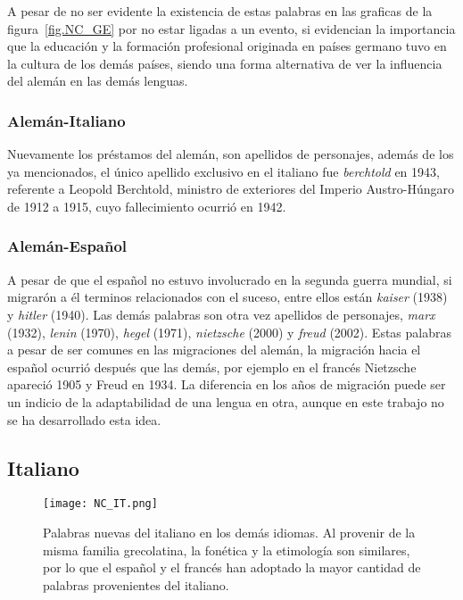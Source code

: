 A pesar de no ser evidente la existencia de estas palabras en las graficas de la figura~\ref{fig.NC_GE} por no estar ligadas a un evento, si evidencian la importancia que la educación y la formación profesional originada en países germano tuvo en la cultura de los demás países,  siendo una forma alternativa de ver la influencia del alemán en las demás lenguas. 

\subsubsection*{Alemán-Italiano}%

Nuevamente los préstamos del alemán,  son apellidos de personajes,  además de los ya mencionados, el único apellido exclusivo en el italiano fue \textit{berchtold} en 1943, referente a Leopold Berchtold, ministro de exteriores del Imperio Austro-Húngaro de 1912 a 1915, cuyo fallecimiento ocurrió en 1942.


  
\subsubsection*{Alemán-Español}%

A pesar de que el español no estuvo involucrado en la segunda guerra mundial, si migrarón a él terminos relacionados con el suceso,  entre ellos están  \textit{kaiser} (1938) y \textit{hitler} (1940). Las demás palabras son otra vez apellidos de personajes, \textit{marx} (1932), \textit{lenin} (1970), \textit{hegel} (1971),  \textit{nietzsche} (2000) y \textit{freud} (2002). Estas palabras a pesar de ser comunes en las migraciones del alemán, la migración hacia el español ocurrió después que las demás, por ejemplo en el francés Nietzsche apareció 1905 y Freud en 1934. La diferencia en los años de migración puede ser un indicio de la adaptabilidad de una lengua en otra, aunque en este trabajo no se ha desarrollado esta idea. 



\subsection{Italiano}%

\begin{figure}[h!]
	\centering
	\texttt{[image: NC\_IT.png]}
	\caption{Palabras nuevas del italiano en los demás idiomas. Al provenir de la misma familia grecolatina, la fonética y la etimología son similares, por lo que  el español y el francés han adoptado la mayor cantidad de palabras provenientes del italiano.} 
	\label{fig.NC_IT}
\end{figure}

